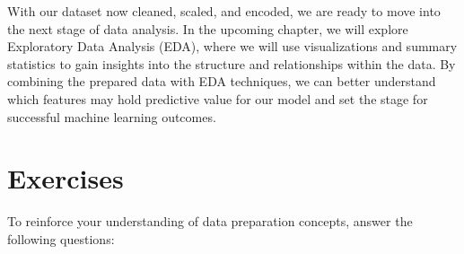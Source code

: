 \documentclass[
]{book}
\theoremstyle{definition}
\theoremstyle{definition}
\theoremstyle{definition}
\theoremstyle{definition}
\theoremstyle{remark}
\begin{document}
With our dataset now cleaned, scaled, and encoded, we are ready to move into the next stage of data analysis. In the upcoming chapter, we will explore Exploratory Data Analysis (EDA), where we will use visualizations and summary statistics to gain insights into the structure and relationships within the data. By combining the prepared data with EDA techniques, we can better understand which features may hold predictive value for our model and set the stage for successful machine learning outcomes.

\section{Exercises}\label{exercises-2}

To reinforce your understanding of data preparation concepts, answer the following questions:
\end{document}

